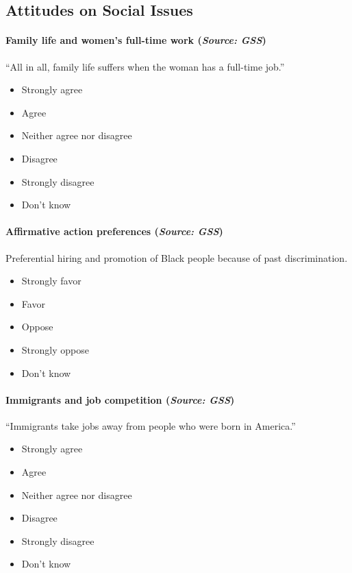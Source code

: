 \subsection{Attitudes on Social Issues}

\paragraph{Family life and women’s full-time work (\textit{Source: GSS})}
“All in all, family life suffers when the woman has a full-time job.”
\begin{itemize}[itemsep=-10pt,topsep=0pt]
\item Strongly agree
\item Agree
\item Neither agree nor disagree
\item Disagree
\item Strongly disagree
\item Don’t know
\end{itemize}

\paragraph{Affirmative action preferences (\textit{Source: GSS})}
Preferential hiring and promotion of Black people because of past discrimination.
\begin{itemize}[itemsep=-10pt,topsep=0pt]
\item Strongly favor
\item Favor
\item Oppose
\item Strongly oppose
\item Don’t know
\end{itemize}

\paragraph{Immigrants and job competition (\textit{Source: GSS})}
“Immigrants take jobs away from people who were born in America.”
\begin{itemize}[itemsep=-10pt,topsep=0pt]
\item Strongly agree
\item Agree
\item Neither agree nor disagree
\item Disagree
\item Strongly disagree
\item Don’t know
\end{itemize}


